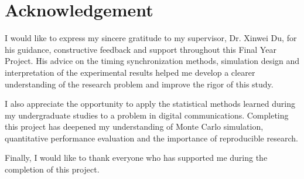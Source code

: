 \chapter*{Acknowledgement}

I would like to express my sincere gratitude to my supervisor, Dr. Xinwei Du, for his guidance, constructive feedback and support throughout this Final Year Project. His advice on the timing synchronization methods, simulation design and interpretation of the experimental results helped me develop a clearer understanding of the research problem and improve the rigor of this study.

I also appreciate the opportunity to apply the statistical methods learned during my undergraduate studies to a problem in digital communications. Completing this project has deepened my understanding of Monte Carlo simulation, quantitative performance evaluation and the importance of reproducible research.

Finally, I would like to thank everyone who has supported me during the completion of this project.

